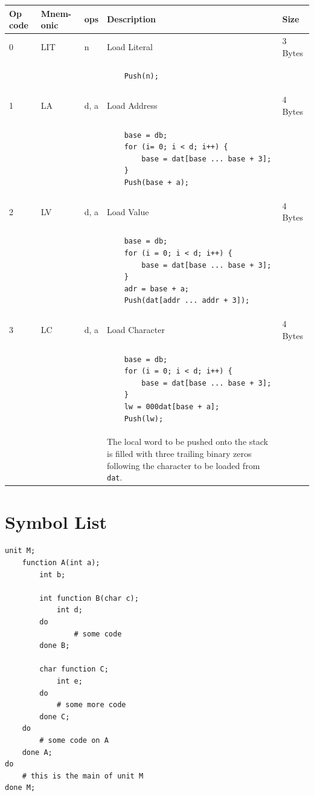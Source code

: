\documentclass[11pt]{report}
\begin{document}
\begin{tabular}{p{2em}|p{2em}|l|p{7cm}|l}
	Op code & Mnem-onic & ops & Description & Size \\ \hline
	0 & LIT & n & Load Literal & 3 Bytes \\
	&&&
	\begin{lstlisting}
	Push(n);
	\end{lstlisting}\\ \hline
	
	1 & LA & d, a & Load Address & 4 Bytes\\
	&&&
	\begin{lstlisting}
	base = db;
	for (i= 0; i < d; i++) {
		base = dat[base ... base + 3];
	}
	Push(base + a);
	\end{lstlisting} \\ \hline
	
	2 & LV & d, a & Load Value & 4 Bytes \\
	&&&
	\begin{lstlisting}
	base = db;
	for (i = 0; i < d; i++) {
		base = dat[base ... base + 3];
	}
	adr = base + a;
	Push(dat[addr ... addr + 3]);
	\end{lstlisting} \\ \hline
	
	3 & LC & d, a & Load Character & 4 Bytes \\
	&&&
	\begin{lstlisting}
	base = db;
	for (i = 0; i < d; i++) {
		base = dat[base ... base + 3];
	}
	lw = 000dat[base + a];
	Push(lw);
	\end{lstlisting} \\
	&&& The local word to be pushed onto the stack is filled with three trailing binary zeros following the character to be loaded from {\tt dat}. \\ \hline
\end{tabular}

\chapter{Symbol List}

\lstset{language=NoBeard, numbers=left, tabsize=2}
\begin{lstlisting}
unit M;
	function A(int a);
		int b;
		
		int function B(char c);
			int d;
		do
				# some code
		done B;
		
		char function C;
			int e;
		do
			# some more code
		done C;
	do
		# some code on A
	done A;
do
	# this is the main of unit M
done M;
\end{lstlisting}
\end{document}
